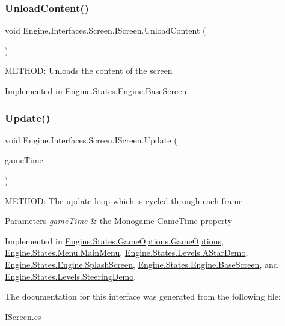 \mbox{\label{a00466_aeba867b4e4bd2f0a918b837d93a4e45a}} 
\subsubsection{\texorpdfstring{Unload\+Content()}{UnloadContent()}}
{\footnotesize\ttfamily void Engine.\+Interfaces.\+Screen.\+I\+Screen.\+Unload\+Content (\begin{DoxyParamCaption}{ }\end{DoxyParamCaption})}



M\+E\+T\+H\+OD\+: Unloads the content of the screen 



Implemented in \hyperlink{a00550_abd2118fc928f9057ddacbe758b80fe68}{Engine.\+States.\+Engine.\+Base\+Screen}.

\mbox{\label{a00466_a5f59b9b12c1bf29b1db612ed52d1cfd6}} 
\subsubsection{\texorpdfstring{Update()}{Update()}}
{\footnotesize\ttfamily void Engine.\+Interfaces.\+Screen.\+I\+Screen.\+Update (\begin{DoxyParamCaption}\item[{Game\+Time}]{game\+Time }\end{DoxyParamCaption})}



M\+E\+T\+H\+OD\+: The update loop which is cycled through each frame 


\begin{DoxyParams}{Parameters}
{\em game\+Time} & the Monogame Game\+Time property\\
\hline
\end{DoxyParams}


Implemented in \hyperlink{a00558_a629d2a00abd6bfcc21524911e74fee3a}{Engine.\+States.\+Game\+Options.\+Game\+Options}, \hyperlink{a00574_ad667a7ff9dea79bee26a4205418c7a61}{Engine.\+States.\+Menu.\+Main\+Menu}, \hyperlink{a00562_aaa91f362f279bd5d226f49fb150f98e3}{Engine.\+States.\+Levels.\+A\+Star\+Demo}, \hyperlink{a00554_af245506899484c6784a44550b1364b6c}{Engine.\+States.\+Engine.\+Splash\+Screen}, \hyperlink{a00550_a098ece7d1e112475f6e880c3a672af64}{Engine.\+States.\+Engine.\+Base\+Screen}, and \hyperlink{a00570_a4210cc45e9038a007132fbafde08fa71}{Engine.\+States.\+Levels.\+Steering\+Demo}.



The documentation for this interface was generated from the following file\+:\begin{DoxyCompactItemize}
\item 
\hyperlink{a00131}{I\+Screen.\+cs}\end{DoxyCompactItemize}
